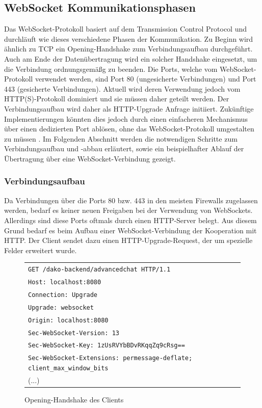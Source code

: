 \documentclass[11pt,a4paper,titlepage]{scrartcl}
\numberwithin{equation}{section}
\begin{document}
\subsection{WebSocket Kommunikationsphasen}\label{subsec:wsLifecycle}
Das WebSocket-Protokoll basiert auf dem Transmission Control Protocol und durchläuft wie dieses verschiedene Phasen der Kommunikation. Zu Beginn wird ähnlich zu TCP ein Opening-Handshake zum Verbindungsaufbau durchgeführt. Auch am Ende der Datenübertragung wird ein solcher Handshake eingesetzt, um die Verbindung ordnungsgemäßg zu beenden. Die Ports, welche vom WebSocket-Protokoll verwendet werden, sind Port 80 (ungesicherte Verbindungen) und Port 443 (gesicherte Verbindungen). Aktuell wird deren Verwendung jedoch vom HTTP(S)-Protokoll dominiert und sie müssen daher geteilt werden. Der Verbindungsaufbau wird daher als HTTP-Upgrade Anfrage initiiert. Zukünftige Implementierungen könnten dies jedoch durch einen einfacheren Mechanismus über einen dedizierten Port ablösen, ohne das WebSocket-Protokoll umgestalten zu müssen \autocite[3]{fette_websocket_2011}. Im Folgenden Abschnitt werden die notwendigen Schritte zum Verbindungsaufbau und -abbau erläutert, sowie ein beispielhafter Ablauf der Übertragung über eine WebSocket-Verbindung gezeigt.

\subsubsection{Verbindungsaufbau}\label{subsubsec:wsOpen}
Da Verbindungen über die Ports 80 bzw. 443 in den meisten Firewalls zugelassen werden, bedarf es keiner neuen Freigaben bei der Verwendung von WebSockets. Allerdings sind diese Ports oftmals durch einen HTTP-Server belegt. Aus diesem Grund bedarf es beim Aufbau einer WebSocket-Verbindung der Kooperation mit HTTP. Der Client sendet dazu einen HTTP-Upgrade-Request, der um spezielle Felder erweitert wurde.

\begin{figure}[ht]
	\begin{center}
		\begin{tabular}{l}
		\texttt{GET /dako-backend/advancedchat HTTP/1.1} \\
		\texttt{Host: localhost:8080} \\
		\texttt{Connection: Upgrade} \\
		\texttt{Upgrade: websocket} \\
		\texttt{Origin: localhost:8080} \\
		\texttt{Sec-WebSocket-Version: 13}\\
		\texttt{Sec-WebSocket-Key: 1zUsRVYbBDvRKqqZq9cRsg==}\\
		\texttt{Sec-WebSocket-Extensions: permessage-deflate; client\_max\_window\_bits}\\
		(...)\vspace{-5mm}
		\end{tabular}
	\end{center}
	\caption{Opening-Handshake des Clients}
	\label{fig:wsOpenHandshakeClient}
\end{figure}
\end{document}
